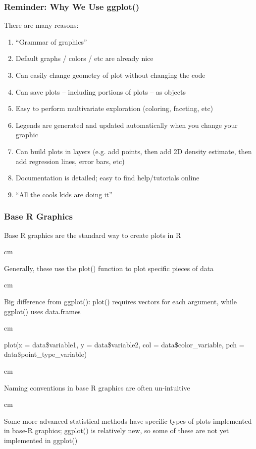 \documentclass{beamer} %
\begin{document}
\begin{frame}\frametitle{Reminder:  Why We Use ggplot()}
	\small
	
	There are many reasons:
	
	\begin{enumerate}
		\item ``Grammar of graphics''
		\item Default graphs / colors / etc are already nice
		\item Can easily change geometry of plot without changing the code
		\item Can save plots -- including portions of plots -- as objects
		\item Easy to perform multivariate exploration (coloring, faceting, etc)
		\item Legends are generated and updated automatically when you change your graphic
		\item Can build plots in layers (e.g. add points, then add 2D density estimate, then add regression lines, error bars, etc)
		\item Documentation is detailed; easy to find help/tutorials online
		\item ``All the cools kids are doing it''
	\end{enumerate}
	
	
\end{frame}




\begin{frame}\frametitle{Base R Graphics}
	\small
	
	Base R graphics are the standard way to create plots in R
	
	 cm
	
	Generally, these use the plot() function to plot specific pieces of data
	
	 cm
	
	Big difference from ggplot():  plot() requires vectors for each argument, while ggplot() uses data.frames
	
	 cm
	
	plot(x = data\$variable1, y = data\$variable2, col = data\$color\_variable, pch = data\$point\_type\_variable)
	
	 cm
	
	Naming conventions in base R graphics are often un-intuitive
	
	 cm
	
	Some more advanced statistical methods have specific types of plots implemented in base-R graphics; ggplot() is relatively new, so some of these are not yet implemented in ggplot()
	
\end{frame}
\end{document}
